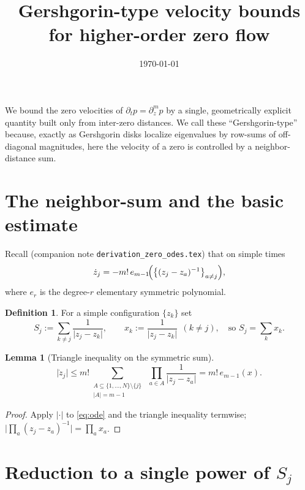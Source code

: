 \documentclass[11pt]{article}
\title{Gershgorin-type velocity bounds for higher-order zero flow}
\author{}
\date{\today}
\theoremstyle{plain}
\newtheorem{lemma}{Lemma}
\theoremstyle{definition}
\newtheorem{definition}{Definition}
\newcommand{\dt}{\partial_t}
\newcommand{\dz}{\partial_z}
\newcommand{\abs}[1]{\lvert #1\rvert}
\begin{document}
\maketitle

We bound the zero velocities of $\dt p=\dz^m p$ by a single, geometrically
explicit quantity built only from inter-zero distances. We call these
``Gershgorin-type'' because, exactly as Gershgorin disks localize eigenvalues
by row-sums of off-diagonal magnitudes, here the velocity of a zero is
controlled by a neighbor-distance sum.

\section{The neighbor-sum and the basic estimate}

Recall (companion note \texttt{derivation\_zero\_odes.tex}) that on simple
times
\begin{equation}\label{eq:ode}
  \dot z_j=-m!\,e_{m-1}\!\Bigl(\bigl\{(z_j-z_a)^{-1}\bigr\}_{a\neq j}\Bigr),
\end{equation}
where $e_{r}$ is the degree-$r$ elementary symmetric polynomial.

\begin{definition}\label{def:Sj}
For a simple configuration $\{z_k\}$ set
\[
  S_j:=\sum_{k\neq j}\frac{1}{\abs{z_j-z_k}},\qquad
  x_k:=\frac{1}{\abs{z_j-z_k}}\ \ (k\neq j),\quad\text{so } S_j=\textstyle\sum_k x_k .
\]
\end{definition}

\begin{lemma}[Triangle inequality on the symmetric sum]\label{lem:tri}
\begin{equation}\label{eq:tri}
  \abs{\dot z_j}
  \le m!\!\!\sum_{\substack{A\subseteq\{1,\dots,N\}\setminus\{j\}\\ |A|=m-1}}
        \;\prod_{a\in A}\frac{1}{\abs{z_j-z_a}}
   = m!\,e_{m-1}(x).
\end{equation}
\end{lemma}

\begin{proof}
Apply $\abs{\cdot}$ to \eqref{eq:ode} and the triangle inequality termwise;
$\abs{\prod_a (z_j-z_a)^{-1}}=\prod_a x_a$.
\end{proof}

\section{Reduction to a single power of $S_j$}
\end{document}
